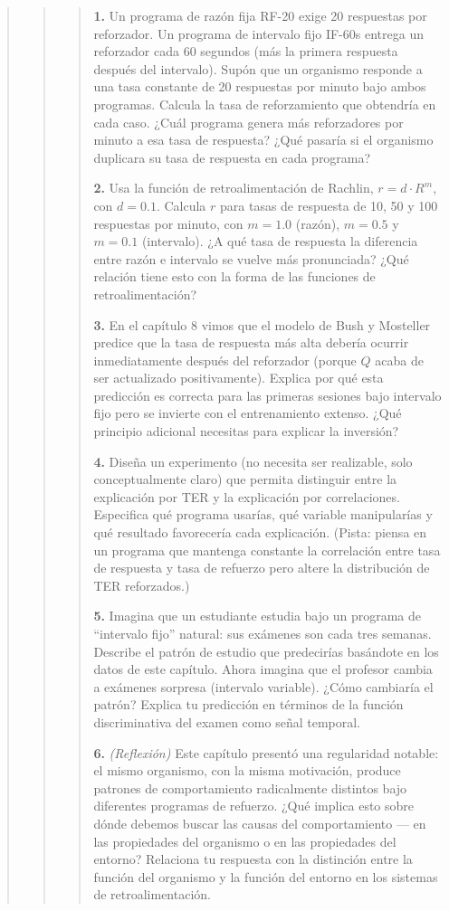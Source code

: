 \documentclass[
  letterpaper,
  DIV=11,
  numbers=noendperiod]{scrreprt}
\begin{document}
\begin{tcolorbox}[enhanced jigsaw, arc=.35mm, bottomrule=.15mm, breakable, colback=white, colframe=quarto-callout-note-color-frame, left=2mm, leftrule=.75mm, opacityback=0, rightrule=.15mm, toprule=.15mm]
\begin{quote}
\begin{quote}
\begin{quote}
\textbf{1.} Un programa de razón fija RF-20 exige 20 respuestas por
reforzador. Un programa de intervalo fijo IF-60s entrega un reforzador
cada 60 segundos (más la primera respuesta después del intervalo). Supón
que un organismo responde a una tasa constante de 20 respuestas por
minuto bajo ambos programas. Calcula la tasa de reforzamiento que
obtendría en cada caso. ¿Cuál programa genera más reforzadores por
minuto a esa tasa de respuesta? ¿Qué pasaría si el organismo duplicara
su tasa de respuesta en cada programa?

\textbf{2.} Usa la función de retroalimentación de Rachlin,
\(r = d \cdot R^m\), con \(d = 0.1\). Calcula \(r\) para tasas de
respuesta de 10, 50 y 100 respuestas por minuto, con \(m = 1.0\)
(razón), \(m = 0.5\) y \(m = 0.1\) (intervalo). ¿A qué tasa de respuesta
la diferencia entre razón e intervalo se vuelve más pronunciada? ¿Qué
relación tiene esto con la forma de las funciones de retroalimentación?

\textbf{3.} En el capítulo 8 vimos que el modelo de Bush y Mosteller
predice que la tasa de respuesta más alta debería ocurrir inmediatamente
después del reforzador (porque \(Q\) acaba de ser actualizado
positivamente). Explica por qué esta predicción es correcta para las
primeras sesiones bajo intervalo fijo pero se invierte con el
entrenamiento extenso. ¿Qué principio adicional necesitas para explicar
la inversión?

\textbf{4.} Diseña un experimento (no necesita ser realizable, solo
conceptualmente claro) que permita distinguir entre la explicación por
TER y la explicación por correlaciones. Especifica qué programa usarías,
qué variable manipularías y qué resultado favorecería cada explicación.
(Pista: piensa en un programa que mantenga constante la correlación
entre tasa de respuesta y tasa de refuerzo pero altere la distribución
de TER reforzados.)

\textbf{5.} Imagina que un estudiante estudia bajo un programa de
``intervalo fijo'' natural: sus exámenes son cada tres semanas. Describe
el patrón de estudio que predecirías basándote en los datos de este
capítulo. Ahora imagina que el profesor cambia a exámenes sorpresa
(intervalo variable). ¿Cómo cambiaría el patrón? Explica tu predicción
en términos de la función discriminativa del examen como señal temporal.

\textbf{6.} \emph{(Reflexión)} Este capítulo presentó una regularidad
notable: el mismo organismo, con la misma motivación, produce patrones
de comportamiento radicalmente distintos bajo diferentes programas de
refuerzo. ¿Qué implica esto sobre dónde debemos buscar las causas del
comportamiento --- en las propiedades del organismo o en las propiedades
del entorno? Relaciona tu respuesta con la distinción entre la función
del organismo y la función del entorno en los sistemas de
retroalimentación.


\end{quote}
\end{quote}
\end{quote}
\end{tcolorbox}
\end{document}
